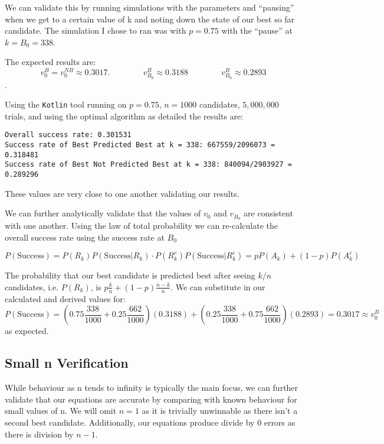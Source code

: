 \documentclass[a4paper,11pt]{article}
\begin{document}
We can validate this by running simulations with the parameters and ``pausing'' when we get to a certain value of k and noting down the state of our best so far candidate. The simulation I chose to ran was with $p=0.75$ with the ``pause'' at $k = B_0 = 338$. 

The expected results are:
$$
v_0^B = v_0^{NB} \approx 0.3017.\hspace{4em} v^B_{B_0} \approx 0.3188 \hspace{4em}  v^B_{B_0} \approx 0.2893
$$.

Using the \verb|Kotlin| tool running on $p =0.75$, $n=1000$ candidates, $5,000,000$ trials, and using the optimal algorithm as detailed the results are:

\begin{verbatim}
Overall success rate: 0.301531
Success rate of Best Predicted Best at k = 338: 667559/2096073 = 0.318481
Success rate of Best Not Predicted Best at k = 338: 840094/2903927 = 0.289296
\end{verbatim}

These values are very close to one another validating our results.

We can further analytically validate that the values of $v_0$ and $v_{B_0}$ are consistent with one another. Using the law of total probability we can re-calculate the overall success rate using the success rate at $B_0$

$$
P(\text{Success}) = P(R_k)P(\text{Success}|R_k)\cdot P(R_k^c)P(\text{Success}|R_k^c) = pP(A_k) + (1-p)P(A_k^c)
$$

The probability that our best candidate is predicted best after seeing $k/n$ candidates, i.e. $P(R_k)$, is $p\frac{k}{n} + (1-p)\frac{n-k}{n}$. We can substitute in our calculated and derived values for:
$$
P(\text{Success}) = (0.75\frac{338}{1000} + 0.25\frac{662}{1000})(0.3188) + (0.25\frac{338}{1000} + 0.75\frac{662}{1000})(0.2893) = 0.3017 \approx v_0^B
$$
as expected.

\subsection{Small n Verification}

While behaviour as n tends to infinity is typically the main focus, we can further validate that our equations are accurate by comparing with known behaviour for small values of n. We will omit $n=1$ as it is trivially unwinnable as there isn't a second best candidate. Additionally, our equations produce divide by 0 errors as there is division by $n-1$.
\end{document}
